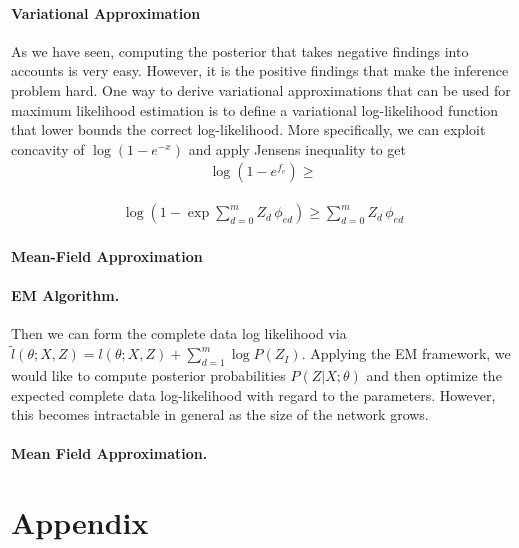 \documentclass{article}
\begin{document}
\newpage


\paragraph{Variational Approximation} 

As we have seen, computing the posterior that takes negative findings into accounts is very easy. However, it is the positive findings that make the inference problem hard. One way to derive variational approximations that can be used for maximum likelihood estimation is to define a variational log-likelihood function that lower bounds the correct log-likelihood. More specifically, we can exploit concavity of $\log(1-e^{-x})$ and apply Jensens inequality to get 
\begin{align}
\log(1-e^{f_e})  \ge
\end{align} 




\newpage

\begin{align}
 \log \left( 1-  \exp \sum_{d=0}^m Z_d \, \phi_{ed}  \right) \ge \sum_{d=0}^m Z_d \, \phi_{ed}
\end{align}

\paragraph{Mean-Field Approximation} 

\newpage




\paragraph{EM Algorithm.} Then we can form the complete data log likelihood via $\tilde l(\theta; X, Z) = l(\theta; X,Z) + \sum_{d=1}^m \log P(Z_I)$. Applying the EM framework, we would like to compute posterior probabilities $P(Z|X; \theta)$ and then optimize the expected complete data log-likelihood with regard to the parameters. However, this becomes intractable in general as the size of the network grows. 

\paragraph{Mean Field Approximation.} 

\section*{Appendix}
\end{document}
